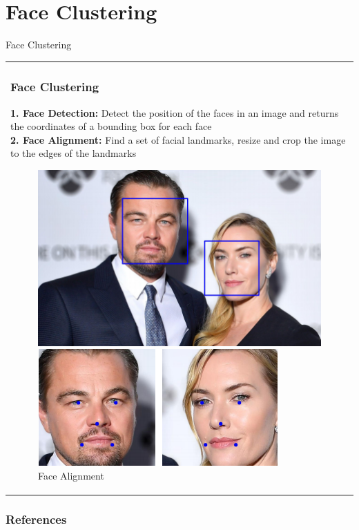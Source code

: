 \documentclass[11pt]{beamer}
\begin{document}
\section{Face Clustering}
\begin{frame}{Face Clustering}
\begin{tabular}{l}
\parbox{1\linewidth}{
\frametitle{Face Clustering}
\bigskip
\textbf{1. Face Detection:} Detect the position of the faces in an image and returns the coordinates of a bounding box for each face\\

\textbf{2. Face Alignment:} Find a set of facial landmarks, resize and crop the image to the edges of the landmarks
\begin{figure}[!tbp]
  \centering
  \begin{minipage}[b]{0.49\textwidth}
    \includegraphics[width=\textwidth]{figures/face_detection.png}
    \caption{Face Detection \cite{trigueros}}
    \label{fig:detect}
  \end{minipage}
    \begin{minipage}[b]{0.49\textwidth}
    \includegraphics[width=\textwidth]{figures/landmark.png}
    \caption{Face Alignment \cite{trigueros}}
    \label{fig:landmark}
  \end{minipage}
\end{figure}
}
\end{tabular}  
\end{frame}


\begin{frame}
\frametitle{References}
\printbibliography
\end{frame}
\end{document}
